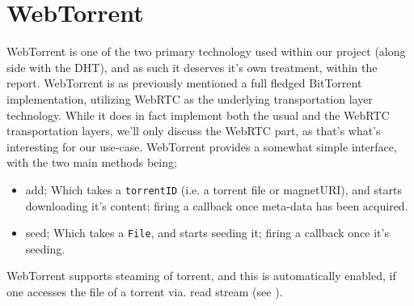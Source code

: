 \section{WebTorrent}
WebTorrent is one of the two primary technology used within our project (along 
side with the \acs{DHT}), and as such it deserves it's own treatment, within the 
report.
\newline\newline
WebTorrent is as previously mentioned a full fledged BitTorrent implementation, 
utilizing WebRTC as the underlying transportation layer technology. While it 
does in fact implement both the usual and the WebRTC transportation layers,
we'll only discuss the WebRTC part, as that's what's interesting for our
use-case.
\newline
WebTorrent provides a somewhat simple interface, with the two main methods being;
\begin{itemize}
    \item add; Which takes a \verb|torrentID| (i.e. a torrent file or magnetURI),
        and starts downloading it's content; firing a callback once meta-data has
        been acquired.
    \item seed; Which takes a \verb|File|, and starts seeding it; firing a
        callback once it's seeding.
\end{itemize}
WebTorrent supports steaming of torrent, and this is automatically enabled, if 
one accesses the file of a torrent via. read stream (see \citep{WebTorrent:api}).
